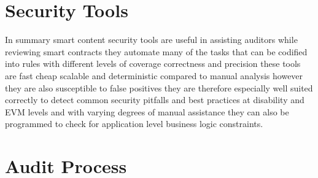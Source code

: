 \section{Security Tools}

In summary smart content security tools are useful in assisting auditors while reviewing smart contracts they automate many of the tasks that can be codified into rules with different levels of coverage correctness and precision these tools are fast cheap scalable and deterministic compared to manual analysis however they are also susceptible to false positives they are therefore especially well suited correctly to detect common security pitfalls and best practices at disability and EVM levels and with varying degrees of manual assistance they can also be programmed to check for application level business logic constraints.

\section{Audit Process}

